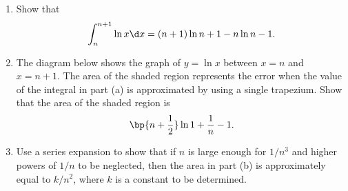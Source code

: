\begin{problem}
    \begin{enumerate}
        \item Show that \[\int_n^{n+1} \ln x \d x = (n+1)\ln{n+1} - n\ln n - 1.\]
        \item The diagram below shows the graph of $y=\ln x$ between $x=n$ and $x=n+1$. The area of the shaded region represents the error when the value of the integral in part (a) is approximated by using a single trapezium. Show that the area of the shaded region is \[\bp{n + \frac12} \ln{1 + \frac1n} - 1.\]

        \begin{center}
        \end{center}
        \item Use a series expansion to show that if $n$ is large enough for $1/n^3$ and higher powers of $1/n$ to be neglected, then the area in part (b) is approximately equal to $k/n^2$, where $k$ is a constant to be determined.
    \end{enumerate}
\end{problem}
